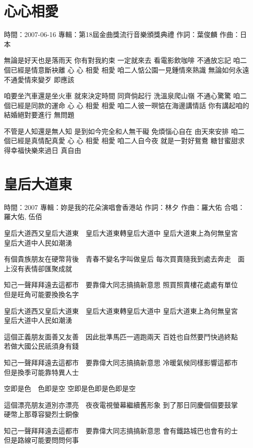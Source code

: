 \documentclass[UTF8,a4paper,oneside,twocolumn,12pt]{ctexbook}
\newcommand{\infopair}[2]{\textbullet #1：#2}
\newcommand{\zc}[1][伍佰]{\infopair{作詞}{#1}}
\newcommand{\zq}[1][伍佰]{\infopair{作曲}{#1}}
\newcommand{\zj}[1]{\infopair{專輯}{#1}}
\newcommand{\sj}[1]{\infopair{時間}{#1}}
\newenvironment{info}{\begin{flushleft}\kaishu
	}
	{\end{flushleft}\normalsize\yahei\par}
\newenvironment{lyric}{
	}
{}
\begin{document}
\section{心心相愛} %
\begin{info}
	\sj{2007-06-16}
	\zj{第18屆金曲獎流行音樂頒獎典禮}
	\zc[葉俊麟]
	\zq[日本]
\end{info}
\begin{lyric} %
	無論是好天也是落雨天
	你有對我約束
	一定就來去
	看電影飲咖啡 不通放忘記
	咱二個已經是情意斷袂離
	心 心 相愛 相愛
	咱二人惦公園一見鍾情來熟識
	無論如何永遠不通愛情來變歹
	即應該

	咱要坐汽車還是坐火車
	就來決定時間
	同齊倘起行
	洗溫泉爬山嶺 不通心驚驚
	咱二個已經是同款的運命
	心 心 相愛 相愛
	咱二人彼一暝惦在海邊講情話
	你有講起咱的結婚絕對要進行
	無問題

	不管是人知還是無人知
	是到如今完全和人無干礙
	免煩惱心自在 由天來安排
	咱二個已經是真情配真愛
	心 心 相愛 相愛
	咱二人自今夜 就是一對好鴛鴦
	糖甘蜜甜求得幸福快樂來過日
	真自由
\end{lyric}

\section{皇后大道東} %
\begin{info}
	\sj{2007}
	\zj{妳是我的花朵演唱會香港站}
	\zc[林夕]
	\zq[羅大佑]
	\infopair{合唱}{羅大佑, 伍佰}
\end{info}
\begin{lyric}
	皇后大道西又皇后大道東　皇后大道東轉皇后大道中
	皇后大道東上為何無皇宮　皇后大道中人民如潮湧

	有個貴族朋友在硬幣背後　青春不變名字叫做皇后
	每次買賣隨我到處去奔走　面上沒有表情卻匯聚成就

	知己一聲拜拜遠去這都市　要靠偉大同志搞搞新意思
	照買照賣樓花處處有單位　但是旺角可能要換換名字

	皇后大道西又皇后大道東　皇后大道東轉皇后大道中
	皇后大道東上為何無皇宮　皇后大道中人民如潮湧

	這個正義朋友面善又友善　因此批準馬匹一週跑兩天
	百姓也自然要鬥快過終點　若做大國公民祇須身有錢

	知己一聲拜拜遠去這都市　要靠偉大同志搞搞新意思
	冷暖氣候同樣影響這都市　但是換季可能靠特異人士

	空即是色　色即是空
	空即是色即是色即是空

	這個漂亮朋友道別亦漂亮　夜夜電視螢幕繼續舊形象
	到了那日同慶個個要鼓掌　硬幣上那尊容變烈士銅像

	知己一聲拜拜遠去這都市　要靠偉大同志搞搞新意思
	會有鐵路城巴也會有的士　但是路線可能要問問何事
\end{lyric}
\end{document}
